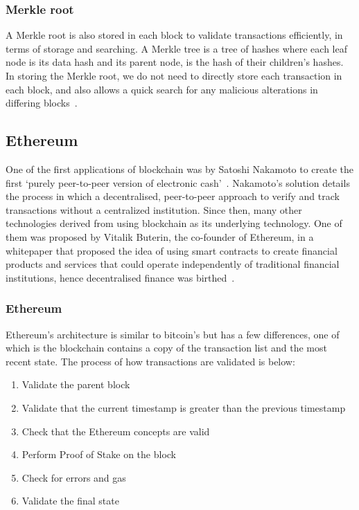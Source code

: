 \subsubsection{Merkle root}
A Merkle root is also stored in each block to validate transactions efficiently, in terms of storage and searching. A Merkle tree is a tree of hashes where each leaf node is its data hash and its parent node, is the hash of their children's hashes. In storing the Merkle root, we do not need to directly store each transaction in each block, and also allows a quick search for any malicious alterations in differing blocks~\cite{noauthor_merkle_nodate}.

\subsection{Ethereum}
One of the first applications of blockchain was by Satoshi Nakamoto to create the first `purely peer-to-peer version of electronic cash'~\cite{nakamoto2009bitcoin}. Nakamoto's solution details the process in which a decentralised, peer-to-peer approach to verify and track transactions without a centralized institution. Since then, many other technologies derived from using blockchain as its underlying technology. One of them was proposed by Vitalik Buterin, the co-founder of Ethereum, in a whitepaper that proposed the idea of using smart contracts to create financial products and services that could operate independently of traditional financial institutions, hence decentralised finance was birthed~\cite{buterin2014next}.

\subsubsection{Ethereum}
Ethereum's architecture is similar to bitcoin's but has a few differences, one of which is the blockchain contains a copy of the transaction list and the most recent state. The process of how transactions are validated is below:
\begin{enumerate}
    \itemsep0em
    \item Validate the parent block
    \item Validate that the current timestamp is greater than the previous timestamp
    \item Check that the Ethereum concepts are valid
    \item Perform Proof of Stake on the block
    \item Check for errors and gas
    \item Validate the final state
\end{enumerate}

